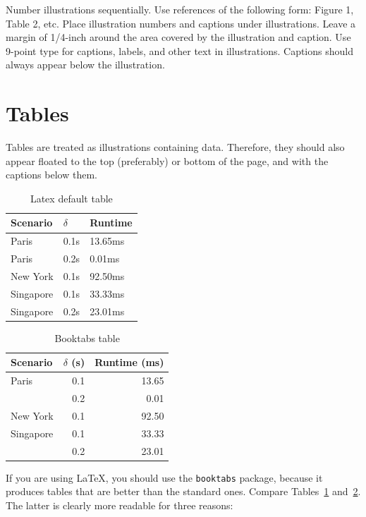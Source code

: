 \documentclass{article}
\begin{document}
Number illustrations sequentially. Use references of the following
form: Figure 1, Table 2, etc. Place illustration numbers and captions
under illustrations. Leave a margin of 1/4-inch around the area
covered by the illustration and caption.  Use 9-point type for
captions, labels, and other text in illustrations. Captions should always appear below the illustration.

\section{Tables}

Tables are treated as illustrations containing data. Therefore, they should also appear floated to the top (preferably) or bottom of the page, and with the captions below them.

\begin{table}
	\centering
	\begin{tabular}{lll}
		\hline
		Scenario  & $\delta$ & Runtime \\
		\hline
		Paris     & 0.1s     & 13.65ms \\
		Paris     & 0.2s     & 0.01ms  \\
		New York  & 0.1s     & 92.50ms \\
		Singapore & 0.1s     & 33.33ms \\
		Singapore & 0.2s     & 23.01ms \\
		\hline
	\end{tabular}
	\caption{Latex default table}
	\label{tab:plain}
\end{table}

\begin{table}
	\centering
	\begin{tabular}{lrr}
		\toprule
		Scenario  & $\delta$ (s) & Runtime (ms) \\
		\midrule
		Paris     & 0.1          & 13.65        \\
		          & 0.2          & 0.01         \\
		New York  & 0.1          & 92.50        \\
		Singapore & 0.1          & 33.33        \\
		          & 0.2          & 23.01        \\
		\bottomrule
	\end{tabular}
	\caption{Booktabs table}
	\label{tab:booktabs}
\end{table}

If you are using \LaTeX, you should use the {\tt booktabs} package, because it produces tables that are better than the standard ones. Compare Tables~\ref{tab:plain} and~\ref{tab:booktabs}. The latter is clearly more readable for three reasons:
\end{document}
